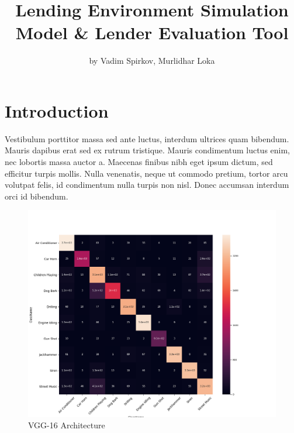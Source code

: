 \title{Lending Environment Simulation Model \& Lender Evaluation Tool}
\author{by Vadim Spirkov, Murlidhar Loka}

\maketitle



\hypertarget{introduction}{%
\section{Introduction}\label{introduction}}

Vestibulum porttitor massa sed ante luctus, interdum ultrices quam
bibendum. Mauris dapibus erat sed ex rutrum tristique. Mauris
condimentum luctus enim, nec lobortis massa auctor a. Maecenas finibus
nibh eget ipsum dictum, sed efficitur turpis mollis. Nulla venenatis,
neque ut commodo pretium, tortor arcu volutpat felis, id condimentum
nulla turpis non nisl. Donec accumsan interdum orci id bibendum.

\begin{Schunk}
\begin{figure}[H]

{\centering \includegraphics[width=1\linewidth]{../images/test} 

}

\caption[VGG-16 Architecture]{VGG-16 Architecture}\label{fig:example}
\end{figure}
\end{Schunk}


